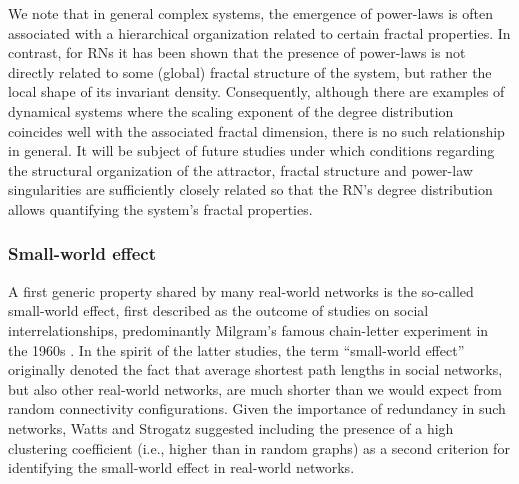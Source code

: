 We note that in general complex systems, the emergence of power-laws is often associated with a hierarchical organization related to certain fractal properties. In contrast, for RNs it has been shown that the presence of power-laws is not directly related to some (global) fractal structure of the system, but rather the local shape of its invariant density. Consequently, although there are examples of dynamical systems where the scaling exponent of the degree distribution coincides well with the associated fractal dimension, there is no such relationship in general. It will be subject of future studies under which conditions regarding the structural organization of the attractor, fractal structure and power-law singularities are sufficiently closely related so that the RN's degree distribution allows quantifying the system's fractal properties.

        
        \subsubsection{Small-world effect}

A first generic property shared by many real-world networks is the so-called small-world effect, first described as the outcome of studies on social interrelationships, predominantly Milgram's famous chain-letter experiment in the 1960s \cite{Milgram1967}. In the spirit of the latter studies, the term ``small-world effect'' originally denoted the fact that average shortest path lengths in social networks, but also other real-world networks, are much shorter than we would expect from random connectivity configurations. Given the importance of redundancy in such networks, Watts and Strogatz \cite{Watts1998} suggested including the presence of a high clustering coefficient (i.e., higher than in random graphs) as a second criterion for identifying the small-world effect in real-world networks.

